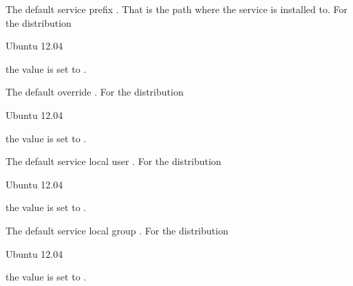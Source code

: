 
The default service prefix . That is the path where the
service is installed to. 
For the distribution
\begin{inparaitem}
\item[\TheDistribution{ubuntu}] Ubuntu 12.04
\end{inparaitem}
the value is set to .


The default override .
For the distribution
\begin{inparaitem}
\item[\TheDistribution{ubuntu}] Ubuntu 12.04
\end{inparaitem}
the value is set to .


The default service local user .
For the distribution
\begin{inparaitem}
\item[\TheDistribution{ubuntu}] Ubuntu 12.04
\end{inparaitem}
the value is set to .


The default service local group .
For the distribution
\begin{inparaitem}
\item[\TheDistribution{ubuntu}] Ubuntu 12.04
\end{inparaitem}
the value is set to .
